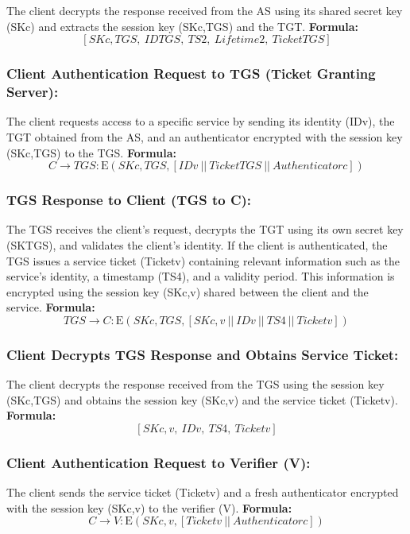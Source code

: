\documentclass[11pt]{article}
\begin{document}
The client decrypts the response received from the AS using its shared secret key (SKc) and extracts the session key (SKc,TGS) and the TGT.
\textbf{Formula:}
\[
[SKc,TGS, \ IDTGS, \ TS2, \ Lifetime2, \ TicketTGS]
\]

\subsubsection{Client Authentication Request to TGS (Ticket Granting Server):}
The client requests access to a specific service by sending its identity (IDv), the TGT obtained from the AS, and an authenticator encrypted with the session key (SKc,TGS) to the TGS.
\textbf{Formula:}
\[
C \rightarrow TGS : \text{E}(SKc,TGS, [IDv \ || \ TicketTGS \ || \ Authenticatorc])
\]

\subsubsection{TGS Response to Client (TGS to C):}
The TGS receives the client's request, decrypts the TGT using its own secret key (SKTGS), and validates the client's identity. If the client is authenticated, the TGS issues a service ticket (Ticketv) containing relevant information such as the service's identity, a timestamp (TS4), and a validity period. This information is encrypted using the session key (SKc,v) shared between the client and the service.
\textbf{Formula:}
\[
TGS \rightarrow C : \text{E}(SKc,TGS, [SKc,v \ || \ IDv \ || \ TS4 \ || \ Ticketv])
\]

\subsubsection*{Client Decrypts TGS Response and Obtains Service Ticket:}
The client decrypts the response received from the TGS using the session key (SKc,TGS) and obtains the session key (SKc,v) and the service ticket (Ticketv).
\textbf{Formula:}
\[
[SKc,v, \ IDv, \ TS4, \ Ticketv]
\]

\subsubsection*{Client Authentication Request to Verifier (V):}
The client sends the service ticket (Ticketv) and a fresh authenticator encrypted with the session key (SKc,v) to the verifier (V).
\textbf{Formula:}
\[
C \rightarrow V : \text{E}(SKc,v, [Ticketv \ || \ Authenticatorc])
\]
\end{document}
